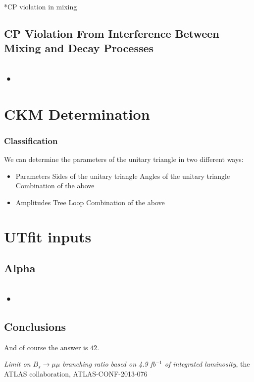 \documentclass[12pt,a4paper]{article}
\begin{document}
*CP violation in mixing 

\subsection{CP Violation From Interference Between Mixing and Decay Processes}					


\subsection{•}

\section{CKM Determination}
\subsubsection{Classification}
We can determine the parameters of the unitary triangle in two different ways:
\begin{itemize}
\item Parameters
\subitem Sides of the unitary triangle 
\subitem Angles of the unitary triangle
\subitem Combination of the above
\item Amplitudes
\subitem Tree
\subitem Loop
\subitem Combination of the above
\end{itemize}

\section{UTfit inputs}

\subsection{Alpha}

\subsection{•}





\subsection{Conclusions}
\label{conclusions}

And of course the answer is $42$.

\begin{thebibliography}{9}

{\it Limit on $B_s\to \mu\mu$ branching ratio based on 4.9 fb$^{-1}$ of integrated luminosity}, 
the ATLAS collaboration, ATLAS-CONF-2013-076
\end{thebibliography}
\end{document}
